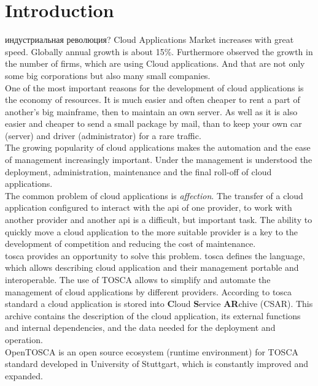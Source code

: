 
\chapter{Introduction}
индустриальная революция?
\fi
Cloud Applications Market increases with great speed. 
Globally annual growth is about 15\%. \cite*{statista_global}
Furthermore observed the growth in the number of firms, which are using Cloud applications. 
And that are not only some big corporations but also many small companies. \cite*{destatis_2014, destatis_2016} \\ 
One of the most important reasons for the development of cloud applications is the economy of resources.
It is much easier and often cheaper to rent a part of another's big mainframe, then to maintain an own server.
As well as it is also easier and cheaper to send a small package by mail, than to keep your own car (server) and driver (administrator) for a rare traffic.\\ 
The growing popularity of cloud applications makes the automation and the ease of management increasingly important.
Under the management is understood the deployment, administration, maintenance and the final roll-off of cloud applications.\\
The common problem of cloud applications is \emph{affection}. 
The transfer of a cloud application configured to interact with the \gls{api} of one provider, to work with another provider and another \gls{api} is a difficult, but important task. 
The ability to quickly move a cloud application to the more suitable provider is a key to the development of competition and reducing the cost of maintenance.\\ %
\gls{tosca} \cite*{TOSCA-v1.0} provides an opportunity to solve this problem. 
\gls{tosca} defines the language, which allows describing cloud application and their management portable and interoperable. 
The use of TOSCA allows to simplify and automate the management of cloud applications by different providers. 
According to \gls{tosca} standard a cloud application is stored into \textbf{C}loud \textbf{S}ervice \textbf{AR}chive (CSAR).
This archive contains the description of the cloud application, its external functions and internal dependencies, and the data needed for the deployment and operation.\\
OpenTOSCA \cite*{OpenTOSCA} is an open source ecosystem (runtime environment) for TOSCA standard developed in University of Stuttgart, which is constantly improved and expanded.
